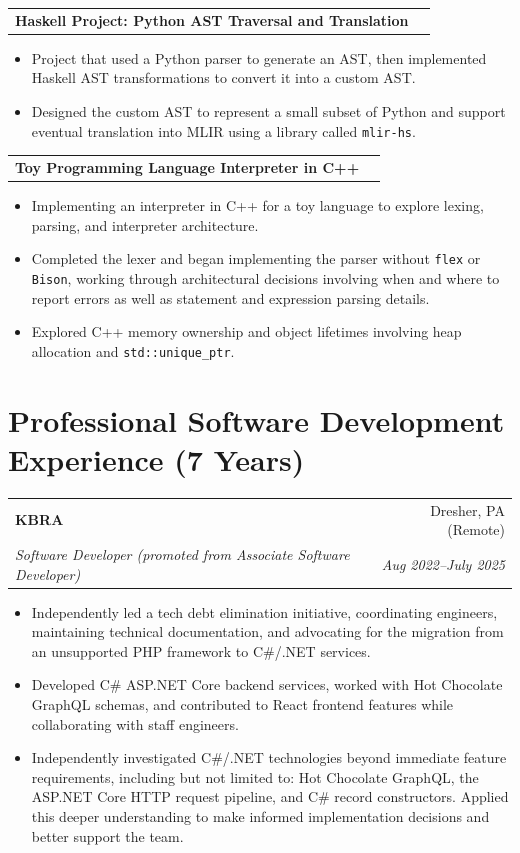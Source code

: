 \documentclass[letterpaper,11pt]{article}
\makeatletter
\newcommand{\resumeSubheading}[4]{%
  \begin{tabular*}{\textwidth}[t]{@{}l@{\extracolsep{\fill}}r@{}}
    \textbf{#1} & \small #2 \\
    \textit{\small #3} & \textit{\small #4} \\
  \end{tabular*}\vspace{0pt}
}
\newcommand{\resumeProjectHeading}[2]{%
  \begin{tabular*}{\textwidth}[t]{@{}l@{\extracolsep{\fill}}r@{}}
    \textbf{#1} & \small #2 \\
  \end{tabular*}\vspace{1pt}
}
\newenvironment{resumeBullets}{%
  \begin{itemize}[leftmargin=0.18in, itemsep=2pt, topsep=2pt, parsep=0pt, partopsep=0pt]
  \small
}{\end{itemize}\vspace{2pt}}
\makeatother
\begin{document}
\resumeProjectHeading{Haskell Project: Python AST Traversal and Translation}{}
\begin{resumeBullets}
	\item Project that used a Python parser to generate an AST, then implemented Haskell
	AST transformations to convert it into a custom AST.
	\item Designed the custom AST to represent a small subset of Python and support
	eventual translation into MLIR using a library called \texttt{mlir-hs}.
\end{resumeBullets}

\resumeProjectHeading{Toy Programming Language Interpreter in C++}{}
\begin{resumeBullets}
	\item Implementing an interpreter in C++ for a toy language to explore lexing,
	parsing, and interpreter architecture.
	\item Completed the lexer and began implementing the parser without \texttt{flex} or
	\texttt{Bison}, working through architectural decisions involving when and
	where to report errors as well as statement and expression parsing details.
	\item Explored C++ memory ownership and object lifetimes involving heap allocation
	and \texttt{std::unique\_ptr}.
\end{resumeBullets}

\section{Professional Software Development Experience (7 Years)}
\resumeSubheading{KBRA}{Dresher, PA (Remote)}{Software Developer (promoted from Associate Software Developer)}{Aug 2022--July 2025}
\begin{resumeBullets}
	\item Independently led a tech debt elimination initiative, coordinating engineers,
	maintaining technical documentation, and advocating for the migration from an
	unsupported PHP framework to C\#/.NET services.
	\item Developed C\# ASP.NET Core backend services, worked with Hot Chocolate GraphQL
	schemas, and contributed to React frontend features while collaborating with
	staff engineers.
	\item Independently investigated C\#/.NET technologies beyond immediate feature
	requirements, including but not limited to: Hot Chocolate GraphQL, the ASP.NET
	Core HTTP request pipeline, and C\# record constructors. Applied this deeper
	understanding to make informed implementation decisions and better support the
	team.\end{resumeBullets}
\end{document}
